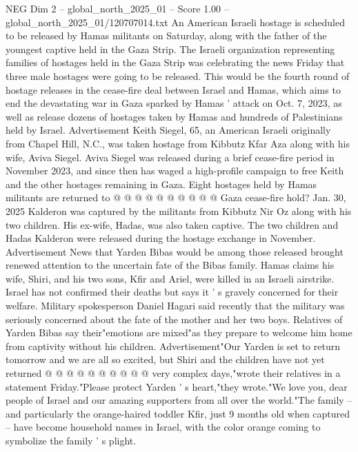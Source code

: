 \begin{textsample}{NEG Dim 2 – global\_north\_2025\_01 – Score 1.00 – global\_north\_2025\_01/120707014.txt}  \label{ex:f2_neg_088}
An American Israeli hostage is scheduled to be released by Hamas militants on Saturday, along with the father of the youngest captive held in the Gaza Strip.
The Israeli organization representing families of hostages held in the Gaza Strip was celebrating the news Friday that three male hostages were going to be released.
This would be the fourth round of hostage releases in the cease-fire deal between Israel and Hamas, which aims to end the devastating war in Gaza sparked by Hamas ' attack on Oct. 7, 2023, as well as release dozens of hostages taken by Hamas and hundreds of Palestinians held by Israel.
Advertisement Keith Siegel, 65, an American Israeli originally from Chapel Hill, N.C., was taken hostage from Kibbutz Kfar Aza along with his wife, Aviva Siegel.
Aviva Siegel was released during a brief cease-fire period in November 2023, and since then has waged a high-profile campaign to free Keith and the other hostages remaining in Gaza.
Eight hostages held by Hamas militants are returned to @ @ @ @ @ @ @ @ @ @ Gaza cease-fire hold?
Jan. 30, 2025 Kalderon was captured by the militants from Kibbutz Nir Oz along with his two children.
His ex-wife, Hadas, was also taken captive.
The two children and Hadas Kalderon were released during the hostage exchange in November.
Advertisement News that Yarden Bibas would be among those released brought renewed attention to the uncertain fate of the Bibas family.
Hamas claims his wife, Shiri, and his two sons, Kfir and Ariel, were killed in an Israeli airstrike.
Israel has not confirmed their deaths but says it ' s gravely concerned for their welfare.
Military spokesperson Daniel Hagari said recently that the military was seriously concerned about the fate of the mother and her two boys.
Relatives of Yarden Bibas say their"emotions are mixed"as they prepare to welcome him home from captivity without his children.
Advertisement"Our Yarden is set to return tomorrow and we are all so excited, but Shiri and the children have not yet returned @ @ @ @ @ @ @ @ @ @ very complex days,"wrote their relatives in a statement Friday."Please protect Yarden ' s heart,"they wrote."We love you, dear people of Israel and our amazing supporters from all over the world."The family -- and particularly the orange-haired toddler Kfir, just 9 months old when captured -- have become household names in Israel, with the color orange coming to symbolize the family ' s plight.

\end{textsample}

